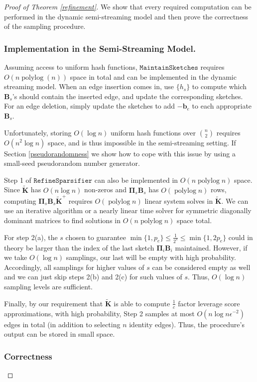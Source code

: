 \documentclass[11pt]{article}
\newcommand{\bs}[1]{\boldsymbol{#1}}
\newcommand{\bv}[1]{\mathbf{#1}}
\newcommand{\refine}{\texttt{RefineSparsifier}}
\newcommand{\maintain}{\texttt{MaintainSketches}}
\newcommand{\plog}{\mathop\mathrm{polylog}}
\begin{document}
\begin{proof}[Proof of Theorem \ref{refinement}]
We show that every required computation can be performed in the dynamic semi-streaming model and then prove the correctness of the sampling procedure. 
\subsubsection*{Implementation in the Semi-Streaming Model.}
Assuming access to uniform hash functions, $\maintain$ requires $O(n\plog (n))$ space in total and can be implemented in the dynamic streaming model. When an edge insertion comes in, use $\{ h_s \}$ to compute which $\bv{B}_s$'s should contain the inserted edge, and update the corresponding sketches. For an edge deletion, simply update the sketches to add $-\bv{b}_e$ to each appropriate $\bv{B}_s$.

Unfortunately, storing $O(\log n)$ uniform hash functions over ${n\choose 2}$ requires $O(n^2\log n)$ space, and is thus impossible in the semi-streaming setting. If Section \ref{pseudorandomness} we show how to cope with this issue by using a small-seed pseudorandom number generator.


Step 1 of $\refine$ can also be implemented in $O(n \plog n)$ space. Since $\bv{\tilde K}$ has $O(n\log n)$ non-zeros and $\bv{\Pi}_s\bv{B}_s$ has $O(\plog n)$ rows, computing $\bv{\Pi}_s\bv{B}_s\bv{\tilde K}^+$ requires $O(\plog n)$ linear system solves in $\bv{\tilde K}$. We can use an iterative algorithm or a nearly linear time solver for symmetric diagonally dominant matrices to find solutions in $O(n \plog n)$ space total.

For step 2(a), the $s$ chosen to guarantee $ \min \{1, p_e \} \le \frac{1}{2^s} \le \min \{1, 2p_e \}$ could in theory be larger than the index of the last sketch $\bs{\Pi}_i\bv{B}_i$ maintained. However, if we take $O(\log n)$ samplings, our last will be empty with high probability. Accordingly, all samplings for higher values of $s$ can be considered empty as well and we can just skip steps 2(b) and 2(c) for such values of $s$. Thus, $O(\log n)$ sampling levels are sufficient.


Finally, by our requirement that $\bv{\tilde K}$ is able to compute $\frac{1}{c}$ factor leverage score approximations, with high probability, Step 2 samples at most $O(n \log n \epsilon^{-2})$ edges in total (in addition to selecting $n$ identity edges). Thus, the procedure's output can be stored in small space.

\subsubsection*{Correctness}


\end{proof}
\end{document}
